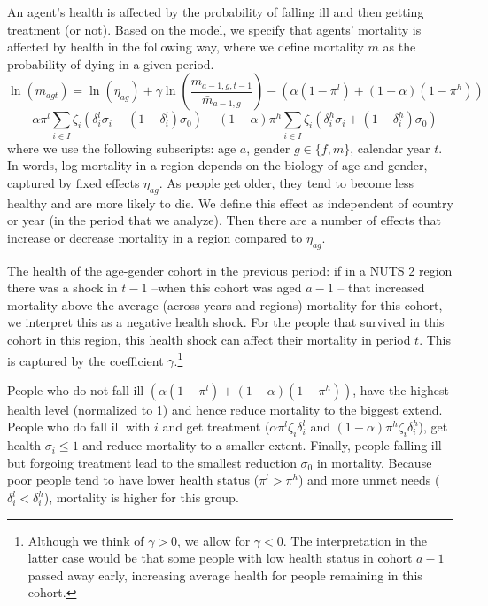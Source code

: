 \documentclass[a4paper,12pt]{article}
\begin{document}
An agent's health is affected by the probability of falling ill and then getting treatment (or not). Based on the model, we specify that agents' mortality is affected by health in the following way, where we define mortality \(m\) as the probability of dying in a given period.
\begin{equation}
\label{eq:health}
\ln(m_{agt}) = \ln({\eta}_{ag}) + \gamma \ln \left( \frac{m_{a-1,g,t-1}}{\bar m_{a-1,g}}\right) - (\alpha (1-\pi^l) + (1-\alpha) (1-\pi^{h})) \end{equation}
\begin{equation*}
 - \alpha \pi^l \sum_{i \in I} \zeta_i (\delta_i^l \sigma_i + (1-\delta_i^l)\sigma_0) - (1-\alpha) \pi^h \sum_{i \in I} \zeta_i (\delta_i^h \sigma_i + (1-\delta_i^h) \sigma_0)
\end{equation*}
where we use the following subscripts: age \(a\), gender \(g \in \{f,m\}\), calendar year \(t\). In words, log mortality in a region depends on the biology of age and gender, captured by fixed effects \(\eta_{ag}\). As people get older, they tend to become less healthy and are more likely to die. We define this effect as independent of country or year (in the period that we analyze). Then there are a number of effects that increase or decrease mortality in a region compared to \(\eta_{ag}\).

The health of the age-gender cohort in the previous period: if in a NUTS 2 region there was a shock in \(t-1\) --when this cohort was aged \(a-1\) -- that increased mortality above the average (across years and regions) mortality for this cohort, we interpret this as a negative health shock. For the people that survived in this cohort in this region, this health shock can affect their mortality in period \(t\). This is captured by the coefficient \(\gamma\).\footnote{Although we think of \(\gamma>0\), we allow for \(\gamma<0\). The interpretation in the latter case would be that some people with low health status in cohort \(a-1\) passed away early, increasing average health for people remaining in this cohort.}

People who do not fall ill \((\alpha(1-\pi^l)+(1-\alpha)(1-\pi^h))\), have the highest health level (normalized to 1) and hence reduce mortality to the biggest extend. People who do fall ill with \(i\) and get treatment (\(\alpha \pi^l \zeta_i \delta_i^l\) and \((1-\alpha)\pi^h \zeta_i \delta_i^h\)), get health \(\sigma_i \leq 1\) and reduce mortality to a smaller extent. Finally, people falling ill but forgoing treatment lead to the smallest reduction \(\sigma_0\) in mortality. Because poor people tend to have lower health status (\(\pi^l>\pi^h\)) and more unmet needs (\(\delta_i^l<\delta_i^h\)), mortality is higher for this group. 
\end{document}
